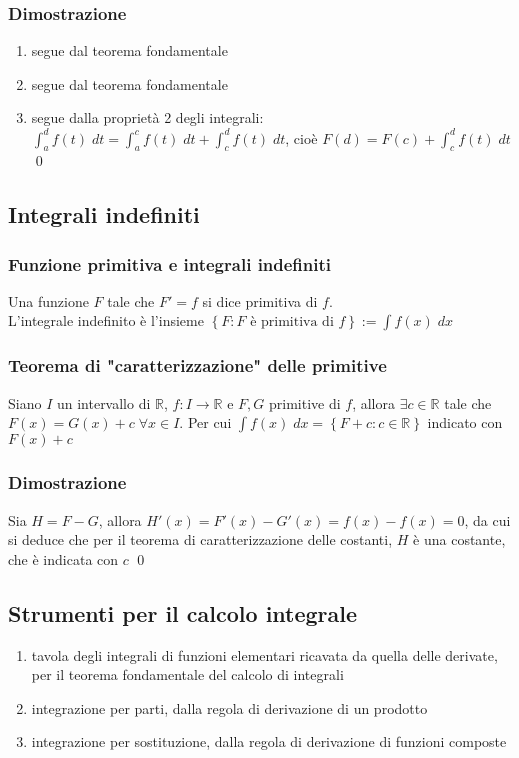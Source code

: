 \documentclass[a4paper]{article}
\begin{document}
\subsubsection*{Dimostrazione}
\begin{enumerate}
	\item segue dal teorema fondamentale
	\item segue dal teorema fondamentale
	\item segue dalla proprietà 2 degli integrali: \\
	\(\displaystyle \int_{a}^{d} f(t)\; dt = \int_{a}^{c} f(t)\; dt + \int_{c}^{d} f(t)\; dt\), cioè \(\displaystyle F(d) = F(c) + \int_{c}^{d} f(t)\; dt\) \qed
\end{enumerate}

\subsection{Integrali indefiniti}
\subsubsection*{Funzione primitiva e integrali indefiniti}
Una funzione \(F\) tale che \(F' = f\) si dice primitiva di \(f\). \\
L'integrale indefinito è l'insieme \(\displaystyle\left\{F : F \text{ è primitiva di } f\right\} := \int f(x) \; dx\)

\subsubsection*{Teorema di "caratterizzazione" delle primitive}
Siano \(I\) un intervallo di \(\mathbb{R}\), \(f:I \to \mathbb{R}\) e \(F, G\) primitive di \(f\), allora \(\exists c \in \mathbb{R}\)
tale che \(F(x) = G(x) + c \; \forall x \in I\). 
Per cui \(\displaystyle \int f(x) \; dx = \left\{F + c : c \in \mathbb{R}\right\}\) indicato con \(F(x) + c\)

\subsubsection*{Dimostrazione}
Sia \(H = F - G\), allora \(H'(x) = F'(x) - G'(x) = f(x) - f(x) = 0\), da cui si deduce che per il teorema di caratterizzazione delle costanti,
\(H\) è una costante, che è indicata con \(c\) \qed

\subsection{Strumenti per il calcolo integrale}
\begin{enumerate}
	\item tavola degli integrali di funzioni elementari ricavata da quella delle derivate, per il teorema fondamentale del calcolo di integrali
	\item integrazione per parti, dalla regola di derivazione di un prodotto
	\item integrazione per sostituzione, dalla regola di derivazione di funzioni composte
\end{enumerate}
\end{document}
